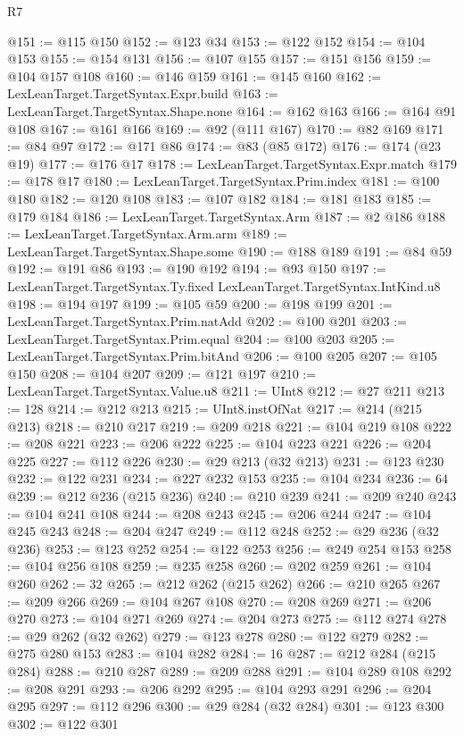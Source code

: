 \begin{lexlean}{R7}
\begin{coremodule}
@151 := @115 @150
@152 := @123 @34
@153 := @122 @152
@154 := @104 @153
@155 := @154 @131
@156 := @107 @155
@157 := @151 @156
@159 := @104 @157 @108
@160 := @146 @159
@161 := @145 @160
@162 := LexLeanTarget.TargetSyntax.Expr.build
@163 := LexLeanTarget.TargetSyntax.Shape.none
@164 := @162 @163
@166 := @164 @91 @108
@167 := @161 @166
@169 := @92 (@111 @167)
@170 := @82 @169
@171 := @84 @97
@172 := @171 @86
@174 := @83 (@85 @172)
@176 := @174 (@23 @19)
@177 := @176 @17
@178 := LexLeanTarget.TargetSyntax.Expr.match
@179 := @178 @17
@180 := LexLeanTarget.TargetSyntax.Prim.index
@181 := @100 @180
@182 := @120 @108
@183 := @107 @182
@184 := @181 @183
@185 := @179 @184
@186 := LexLeanTarget.TargetSyntax.Arm
@187 := @2 @186
@188 := LexLeanTarget.TargetSyntax.Arm.arm
@189 := LexLeanTarget.TargetSyntax.Shape.some
@190 := @188 @189
@191 := @84 @59
@192 := @191 @86
@193 := @190 @192
@194 := @93 @150
@197 := LexLeanTarget.TargetSyntax.Ty.fixed LexLeanTarget.TargetSyntax.IntKind.u8
@198 := @194 @197
@199 := @105 @59
@200 := @198 @199
@201 := LexLeanTarget.TargetSyntax.Prim.natAdd
@202 := @100 @201
@203 := LexLeanTarget.TargetSyntax.Prim.equal
@204 := @100 @203
@205 := LexLeanTarget.TargetSyntax.Prim.bitAnd
@206 := @100 @205
@207 := @105 @150
@208 := @104 @207
@209 := @121 @197
@210 := LexLeanTarget.TargetSyntax.Value.u8
@211 := UInt8
@212 := @27 @211
@213 := 128
@214 := @212 @213
@215 := UInt8.instOfNat
@217 := @214 (@215 @213)
@218 := @210 @217
@219 := @209 @218
@221 := @104 @219 @108
@222 := @208 @221
@223 := @206 @222
@225 := @104 @223 @221
@226 := @204 @225
@227 := @112 @226
@230 := @29 @213 (@32 @213)
@231 := @123 @230
@232 := @122 @231
@234 := @227 @232 @153
@235 := @104 @234
@236 := 64
@239 := @212 @236 (@215 @236)
@240 := @210 @239
@241 := @209 @240
@243 := @104 @241 @108
@244 := @208 @243
@245 := @206 @244
@247 := @104 @245 @243
@248 := @204 @247
@249 := @112 @248
@252 := @29 @236 (@32 @236)
@253 := @123 @252
@254 := @122 @253
@256 := @249 @254 @153
@258 := @104 @256 @108
@259 := @235 @258
@260 := @202 @259
@261 := @104 @260
@262 := 32
@265 := @212 @262 (@215 @262)
@266 := @210 @265
@267 := @209 @266
@269 := @104 @267 @108
@270 := @208 @269
@271 := @206 @270
@273 := @104 @271 @269
@274 := @204 @273
@275 := @112 @274
@278 := @29 @262 (@32 @262)
@279 := @123 @278
@280 := @122 @279
@282 := @275 @280 @153
@283 := @104 @282
@284 := 16
@287 := @212 @284 (@215 @284)
@288 := @210 @287
@289 := @209 @288
@291 := @104 @289 @108
@292 := @208 @291
@293 := @206 @292
@295 := @104 @293 @291
@296 := @204 @295
@297 := @112 @296
@300 := @29 @284 (@32 @284)
@301 := @123 @300
@302 := @122 @301

\end{coremodule}
\end{lexlean}
